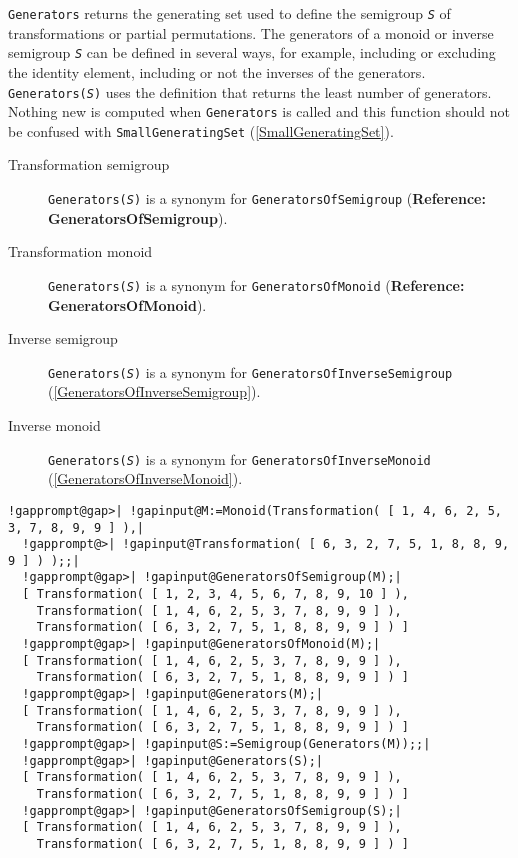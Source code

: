 \documentclass[a4paper,11pt]{report}
\begin{document}
{{{ \texttt{Generators} returns the generating set used to define the semigroup \mbox{\texttt{\mdseries\slshape S}} of transformations or partial permutations. The generators of a monoid or
inverse semigroup \mbox{\texttt{\mdseries\slshape S}} can be defined in several ways, for example, including or excluding the
identity element, including or not the inverses of the generators. \texttt{Generators(\mbox{\texttt{\mdseries\slshape S}})} uses the definition that returns the least number of generators. Nothing new
is computed when \texttt{Generators} is called and this function should not be confused with \texttt{SmallGeneratingSet} (\ref{SmallGeneratingSet}). 
\begin{description}
\item[{Transformation semigroup}] \texttt{Generators(\mbox{\texttt{\mdseries\slshape S}})} is a synonym for \texttt{GeneratorsOfSemigroup} (\textbf{Reference: GeneratorsOfSemigroup}). 
\item[{Transformation monoid}] \texttt{Generators(\mbox{\texttt{\mdseries\slshape S}})} is a synonym for \texttt{GeneratorsOfMonoid} (\textbf{Reference: GeneratorsOfMonoid}). 
\item[{Inverse semigroup}] \texttt{Generators(\mbox{\texttt{\mdseries\slshape S}})} is a synonym for \texttt{GeneratorsOfInverseSemigroup} (\ref{GeneratorsOfInverseSemigroup}). 
\item[{Inverse monoid}] \texttt{Generators(\mbox{\texttt{\mdseries\slshape S}})} is a synonym for \texttt{GeneratorsOfInverseMonoid} (\ref{GeneratorsOfInverseMonoid}). 
\end{description}
 
\begin{Verbatim}[commandchars=!@|,fontsize=\small,frame=single,label=Example]
  !gapprompt@gap>| !gapinput@M:=Monoid(Transformation( [ 1, 4, 6, 2, 5, 3, 7, 8, 9, 9 ] ),|
  !gapprompt@>| !gapinput@Transformation( [ 6, 3, 2, 7, 5, 1, 8, 8, 9, 9 ] ) );;|
  !gapprompt@gap>| !gapinput@GeneratorsOfSemigroup(M);|
  [ Transformation( [ 1, 2, 3, 4, 5, 6, 7, 8, 9, 10 ] ), 
    Transformation( [ 1, 4, 6, 2, 5, 3, 7, 8, 9, 9 ] ), 
    Transformation( [ 6, 3, 2, 7, 5, 1, 8, 8, 9, 9 ] ) ]
  !gapprompt@gap>| !gapinput@GeneratorsOfMonoid(M);|
  [ Transformation( [ 1, 4, 6, 2, 5, 3, 7, 8, 9, 9 ] ), 
    Transformation( [ 6, 3, 2, 7, 5, 1, 8, 8, 9, 9 ] ) ]
  !gapprompt@gap>| !gapinput@Generators(M);|
  [ Transformation( [ 1, 4, 6, 2, 5, 3, 7, 8, 9, 9 ] ), 
    Transformation( [ 6, 3, 2, 7, 5, 1, 8, 8, 9, 9 ] ) ]
  !gapprompt@gap>| !gapinput@S:=Semigroup(Generators(M));;|
  !gapprompt@gap>| !gapinput@Generators(S);|
  [ Transformation( [ 1, 4, 6, 2, 5, 3, 7, 8, 9, 9 ] ), 
    Transformation( [ 6, 3, 2, 7, 5, 1, 8, 8, 9, 9 ] ) ]
  !gapprompt@gap>| !gapinput@GeneratorsOfSemigroup(S);|
  [ Transformation( [ 1, 4, 6, 2, 5, 3, 7, 8, 9, 9 ] ), 
    Transformation( [ 6, 3, 2, 7, 5, 1, 8, 8, 9, 9 ] ) ]
\end{Verbatim}
 }

}}
\end{document}
